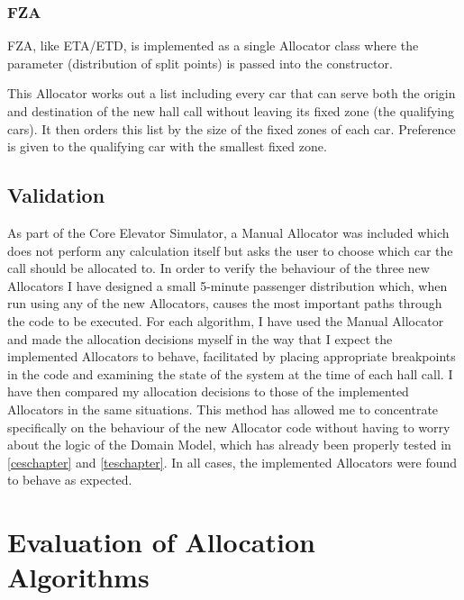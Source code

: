\documentclass{UoYCSproject}
\begin{document}
\subsection{FZA}

FZA, like ETA/ETD, is implemented as a single Allocator class where the parameter (distribution of split points) is passed into the constructor.

This Allocator works out a list including every car that can serve both the origin and destination of the new hall call without leaving its fixed zone (the qualifying cars).  It then orders this list by the size of the fixed zones of each car.  Preference is given to the qualifying car with the smallest fixed zone.

\section{Validation}

As part of the Core Elevator Simulator, a Manual Allocator was included which does not perform any calculation itself but asks the user to choose which car the call should be allocated to.  In order to verify the behaviour of the three new Allocators I have designed a small 5-minute passenger distribution which, when run using any of the new Allocators, causes the most important paths through the code to be executed.  For each algorithm, I have used the Manual Allocator and made the allocation decisions myself in the way that I expect the implemented Allocators to behave, facilitated by placing appropriate breakpoints in the code and examining the state of the system at the time of each hall call.  I have then compared my allocation decisions to those of the implemented Allocators in the same situations.  This method has allowed me to concentrate specifically on the behaviour of the new Allocator code without having to worry about the logic of the Domain Model, which has already been properly tested in \autoref{ceschapter} and \autoref{teschapter}.  In all cases, the implemented Allocators were found to behave as expected.

\chapter{Evaluation of Allocation Algorithms}
\label{algevaluation}
\end{document}
